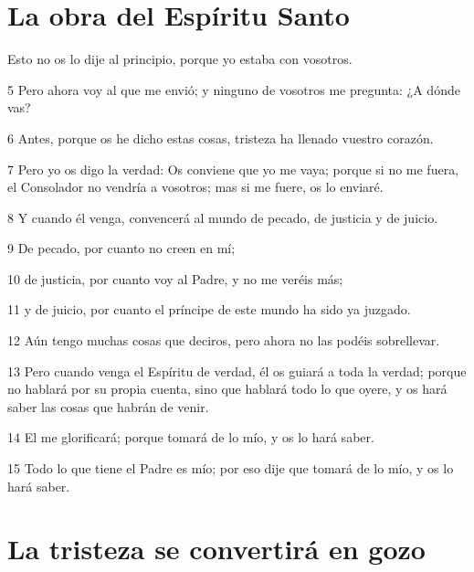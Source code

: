 \section*{La obra del Espíritu Santo}

\par Esto no os lo dije al principio, porque yo estaba con vosotros.
\par 5 Pero ahora voy al que me envió; y ninguno de vosotros me pregunta: ¿A dónde vas?
\par 6 Antes, porque os he dicho estas cosas, tristeza ha llenado vuestro corazón.
\par 7 Pero yo os digo la verdad: Os conviene que yo me vaya; porque si no me fuera, el Consolador no vendría a vosotros; mas si me fuere, os lo enviaré.
\par 8 Y cuando él venga, convencerá al mundo de pecado, de justicia y de juicio.
\par 9 De pecado, por cuanto no creen en mí;
\par 10 de justicia, por cuanto voy al Padre, y no me veréis más;
\par 11 y de juicio, por cuanto el príncipe de este mundo ha sido ya juzgado.
\par 12 Aún tengo muchas cosas que deciros, pero ahora no las podéis sobrellevar.
\par 13 Pero cuando venga el Espíritu de verdad, él os guiará a toda la verdad; porque no hablará por su propia cuenta, sino que hablará todo lo que oyere, y os hará saber las cosas que habrán de venir.
\par 14 El me glorificará; porque tomará de lo mío, y os lo hará saber.
\par 15 Todo lo que tiene el Padre es mío; por eso dije que tomará de lo mío, y os lo hará saber.

\section*{La tristeza se convertirá en gozo}

